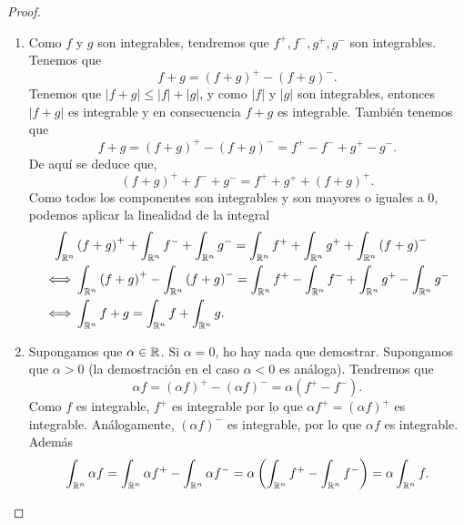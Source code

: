 \begin{proof}
\begin{enumerate}
\item Como $\displaystyle f $ y $\displaystyle g $ son integrables, tendremos que $\displaystyle f^{+}, f^{-}, g^{+}, g^{-} $ son integrables. Tenemos que 
	\[f + g = \left(f+g\right)^{+} - \left(f+g\right)^{-}  .\]
	Tenemos que $\displaystyle \left|f+g\right|\leq \left|f\right|+ \left|g\right| $, y como $\displaystyle \left|f\right| $ y $\displaystyle \left|g\right| $ son integrables, entonces $\displaystyle \left|f +g\right| $ es integrable y en consecuencia $\displaystyle f + g $ es integrable. También tenemos que 
	\[f + g = \left(f+g\right)^{+}-\left(f+g\right)^{-}=f^{+}-f^{-}+g^{+}-g^{-} .\]
	De aquí se deduce que,
\[\left(f+g\right)^{+}+f^{-}+g^{-}=f^{+}+g^{+}+\left(f+g\right)^{+} .\]
Como todos los componentes son integrables y son mayores o iguales a 0, podemos aplicar la linealidad de la integral
\[
\begin{split}
	\int _{\mathbb{R}^{n}} &\left(f+g\right)^{+} +\int _{\mathbb{R}^{n}}f^{-} +\int _{\mathbb{R}^{n}}g^{-} =\int _{\mathbb{R}^{n}}f^{+} + \int _{\mathbb{R}^{n}}g^{+} +\int _{\mathbb{R}^{n}}\left(f+g\right)^{-} \\
 \iff & \int _{\mathbb{R}^{n}}\left(f+g\right)^{+} -\int _{\mathbb{R}^{n}}\left(f+g\right)^{-} = \int _{\mathbb{R}^{n}}f^{+} -\int _{\mathbb{R}^{n}}f^{-} +\int _{\mathbb{R}^{n}}g^{+} -\int _{\mathbb{R}^{n}}g^{-} \\
 \iff & \int _{\mathbb{R}^{n}}f + g = \int _{\mathbb{R}^{n}}f +\int _{\mathbb{R}^{n}}g .
\end{split}
\]
\item Supongamos que $\displaystyle \alpha \in \mathbb{R} $. Si $\displaystyle \alpha = 0 $, ho hay nada que demostrar. Supongamos que $\displaystyle \alpha > 0 $ (la demostración en el caso $\displaystyle \alpha < 0 $ es análoga). Tendremos que 
	\[\alpha f = \left(\alpha f\right)^{+}-\left(\alpha f\right)^{-}=\alpha \left(f^{+}-f^{-}\right) .\]
Como $\displaystyle f $ es integrable, $\displaystyle f^{+} $ es integrable por lo que $\displaystyle \alpha f^{+}=\left(\alpha f\right)^{+} $ es integrable. Análogamente, $\displaystyle \left(\alpha f\right)^{-} $ es integrable, por lo que $\displaystyle \alpha f $ es integrable. Además
\[\int _{\mathbb{R}^{n}}\alpha f = \int _{\mathbb{R}^{n}}\alpha f^{+} -\int _{\mathbb{R}^{n}}\alpha f^{-} =\alpha \left(\int _{\mathbb{R}^{n}}f ^{+}-\int _{\mathbb{R}^{n}}f^{-} \right)=\alpha \int _{\mathbb{R}^{n}}f  .\]
\end{enumerate}
\end{proof}
